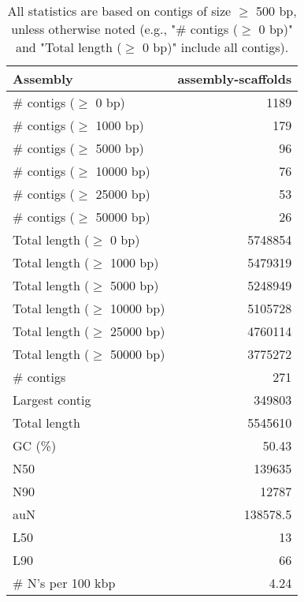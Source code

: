 \documentclass[12pt,a4paper]{article}
\begin{document}
\begin{table}[ht]
\begin{center}
\caption{All statistics are based on contigs of size $\geq$ 500 bp, unless otherwise noted (e.g., "\# contigs ($\geq$ 0 bp)" and "Total length ($\geq$ 0 bp)" include all contigs).}
\begin{tabular}{|l*{1}{|r}|}
\hline
Assembly & assembly-scaffolds \\ \hline
\# contigs ($\geq$ 0 bp) & 1189 \\ \hline
\# contigs ($\geq$ 1000 bp) & 179 \\ \hline
\# contigs ($\geq$ 5000 bp) & 96 \\ \hline
\# contigs ($\geq$ 10000 bp) & 76 \\ \hline
\# contigs ($\geq$ 25000 bp) & 53 \\ \hline
\# contigs ($\geq$ 50000 bp) & 26 \\ \hline
Total length ($\geq$ 0 bp) & 5748854 \\ \hline
Total length ($\geq$ 1000 bp) & 5479319 \\ \hline
Total length ($\geq$ 5000 bp) & 5248949 \\ \hline
Total length ($\geq$ 10000 bp) & 5105728 \\ \hline
Total length ($\geq$ 25000 bp) & 4760114 \\ \hline
Total length ($\geq$ 50000 bp) & 3775272 \\ \hline
\# contigs & 271 \\ \hline
Largest contig & 349803 \\ \hline
Total length & 5545610 \\ \hline
GC (\%) & 50.43 \\ \hline
N50 & 139635 \\ \hline
N90 & 12787 \\ \hline
auN & 138578.5 \\ \hline
L50 & 13 \\ \hline
L90 & 66 \\ \hline
\# N's per 100 kbp & 4.24 \\ \hline
\end{tabular}
\end{center}
\end{table}
\end{document}
